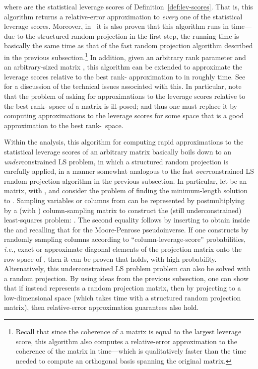 \documentclass[twoside]{article}
\begin{document}
where 
are the statistical leverage scores of Definition~\ref{def:lev-scores}.
That is, this algorithm returns a relative-error 
approximation to \emph{every} one of the  statistical leverage scores.
Moreover, in~\cite{DMMW11_TR} it is also proven that this algorithm runs in 
 time---due to the structured random projection in the first step, 
the running time is basically the same time as that of the fast random projection 
algorithm described in the previous subsection.\footnote{Recall that since the coherence of a matrix is equal 
to the largest leverage score, this algorithm also computes a relative-error
approximation to the coherence of the matrix in  time---which 
is qualitatively faster than the time needed to compute an orthogonal basis
spanning the original matrix.} 
In addition, given an arbitrary rank parameter  and an arbitrary-sized 
 matrix , this algorithm can be extended to approximate the 
leverage scores relative to the best rank- approximation to  in 
roughly  time.
See~\cite{DMMW11_TR} for a discussion of the technical issues associated 
with this.  In particular, note that the problem of asking for approximations 
to the leverage scores relative to the best rank- space of a matrix is 
ill-posed; and thus one must replace it by computing approximations to the 
leverage scores for some space that is a good approximation to the best 
rank-~space.

Within the analysis, this algorithm for computing rapid approximations to 
the statistical leverage scores of an arbitrary matrix basically boils down 
to an \emph{under}constrained LS problem, in which a structured random 
projection is carefully applied, in a manner somewhat analogous to the fast 
\emph{over}constrained LS random projection algorithm in the previous 
subsection.
In particular, let  be an  matrix, with , and 
consider the problem of finding the minimum-length solution to
.
Sampling variables or columns from  can be represented by postmultiplying
 by a  (with ) column-sampling matrix  to
construct the (still underconstrained) least-squares problem:
.
The second equality follows by inserting  to obtain
 inside the  and recalling that
 for the Moore-Penrose pseudoinverse.
If one constructs  by randomly sampling 
 columns
according to ``column-leverage-score'' probabilities, \emph{i.e.}, exact or approximate
diagonal elements of the projection matrix onto the row space of , then it can
be proven that 
holds, with high probability.
Alternatively, this underconstrained LS problem problem can also be solved 
with a random projection.
By using ideas from the previous subsection, one can show that if  
instead represents a random projection matrix, then by projecting to a 
low-dimensional space (which takes  time with  a structured random 
projection matrix), then relative-error approximation guarantees also hold.
\end{document}
